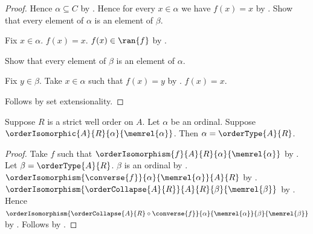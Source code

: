 \begin{proof}
    Hence $\alpha\subseteq C$
        by .
    Hence for every $x\in\alpha$ we have $f(x)=x$
        by .
    Show that every element of $\alpha$ is an element of $\beta$.
    \begin{subproof}
        Fix $x\in\alpha$.
        $f(x)=x$.
        $f(x)\in\ran{f}$ by .
    \end{subproof}
    Show that every element of $\beta$ is an element of $\alpha$.
    \begin{subproof}
        Fix $y\in\beta$.
        Take $x\in\alpha$ such that $f(x)=y$
            by .
        $f(x)=x$.
    \end{subproof}
    Follows by set extensionality.
\end{proof}

\begin{theorem}\label{ordinal_order_type_unique}
    Suppose $R$ is a strict well order on $A$.
    Let $\alpha$ be an ordinal.
    Suppose $\orderIsomorphic{A}{R}{\alpha}{\memrel{\alpha}}$.
    Then $\alpha=\orderType{A}{R}$.
\end{theorem}
\begin{proof}
    Take $f$ such that
        $\orderIsomorphism{f}{A}{R}{\alpha}{\memrel{\alpha}}$
        by .
    Let $\beta=\orderType{A}{R}$.
    $\beta$ is an ordinal by .
    $\orderIsomorphism{\converse{f}}{\alpha}{\memrel{\alpha}}{A}{R}$
        by .
    $\orderIsomorphism{\orderCollapse{A}{R}}
        {A}{R}{\beta}{\memrel{\beta}}$
        by .
    Hence
        $\orderIsomorphism{
            \orderCollapse{A}{R}\circ\converse{f}}
            {\alpha}{\memrel{\alpha}}{\beta}{\memrel{\beta}}$
        by .
    Follows by .
\end{proof}

